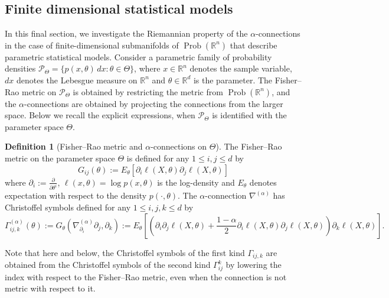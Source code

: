\documentclass[11pt,reqno]{amsart}
\theoremstyle{definition}
\newtheorem{definition}[theorem]{Definition}
\newcommand{\R}{\mathbb R}
\newcommand{\Prob}{\operatorname{Prob}(M)}
\begin{document}
\subsection{Finite dimensional statistical models}
In this final section, we investigate the Riemannian property of the $\alpha$-connections in the case of finite-dimensional submanifolds of $\operatorname{Prob}(\R^n)$ that describe parametric statistical models. 
Consider a parametric family of probability densities $\mathcal P_\Theta = \{p(x,\theta)\,dx: \theta\in\Theta\}$, where $x\in\R^n$ denotes the sample variable, $dx$ denotes the Lebesgue measure on $\R^n$ and $\theta\in\R^d$ is the parameter. 
The Fisher--Rao metric on $\mathcal{P}_\Theta$ is obtained by restricting the metric from $\operatorname{Prob}(\R^n)$, and the $\alpha$-connections are obtained by projecting the connections from the larger space.
Below we recall the explicit expressions, when  $\mathcal{P}_\Theta$ is identified with the parameter space $\Theta$.
\begin{definition}[Fisher--Rao metric and $\alpha$-connections on $\Theta$]
The Fisher--Rao metric on the parameter space $\Theta$ is defined for any $1\leq i,j\leq d$ by
\[
G_{ij}(\theta):=E_\theta\left[\partial_i\ell(X,\theta)\partial_j\ell(X,\theta)\right]
\]
where $\partial_i:=\frac{\partial}{\partial\theta^i}$, $\ell(x,\theta)=\log p(x,\theta)$ is the log-density and $E_\theta$ denotes expectation with respect to the density $p(\cdot,\theta)$. The $\alpha$-connection $\nabla^{(\alpha)}$ has Christoffel symbols defined for any $1\leq i,j,k\leq d$ by%
$$\Gamma^{(\alpha)}_{ij,k}(\theta):=G_\theta(\nabla^{(\alpha)}_{\partial_i}\partial_j,\partial_k):=E_\theta\left[\left(\partial_i\partial_j\ell(X,\theta)+\frac{1-\alpha}{2}\partial_i\ell(X,\theta)\partial_j\ell(X,\theta)\right)\partial_k\ell(X,\theta)\right].$$
\end{definition}
Note that here and below, the Christoffel symbols of the first kind $\Gamma_{ij,k}$ are obtained from the Christoffel symbols of the second kind $\Gamma_{ij}^k$ by lowering the index with respect to the Fisher--Rao metric, even when the connection is not metric with respect to it.
\end{document}
